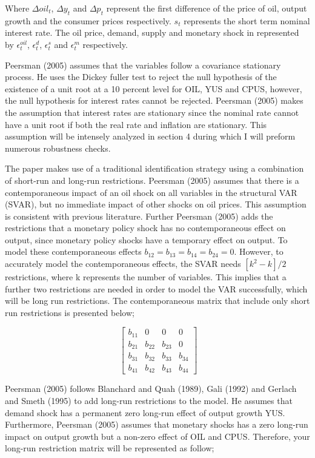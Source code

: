\documentclass[11pt,preprint, authoryear]{elsarticle}
\numberwithin{equation}{section}
\numberwithin{figure}{section}
\numberwithin{table}{section}
\begin{document}
Where \(\Delta oil_t\), \(\Delta y_t\) and \(\Delta p_t\) represent the
first difference of the price of oil, output growth and the consumer
prices respectively. \(s_t\) represents the short term nominal interest
rate. The oil price, demand, supply and monetary shock in represented by
\(\epsilon_t^{oil}\), \(\epsilon_t^{d}\), \(\epsilon_t^{s}\) and
\(\epsilon_t^{m}\) respectively.

Peersman (2005) assumes that the variables follow a covariance
stationary process. He uses the Dickey fuller test to reject the null
hypothesis of the existence of a unit root at a 10 percent level for
OIL, YUS and CPUS, however, the null hypothesis for interest rates
cannot be rejected. Peersman (2005) makes the assumption that interest
rates are stationary since the nominal rate cannot have a unit root if
both the real rate and inflation are stationary. This assumption will be
intensely analyzed in section 4 during which I will preform numerous
robustness checks.

The paper makes use of a traditional identification strategy using a
combination of short-run and long-run restrictions. Peersman (2005)
assumes that there is a contemporaneous impact of an oil shock on all
variables in the structural VAR (SVAR), but no immediate impact of other
shocks on oil prices. This assumption is consistent with previous
literature. Further Peersman (2005) adds the restrictions that a
monetary policy shock has no contemporaneous effect on output, since
monetary policy shocks have a temporary effect on output. To model these
contemporaneous effects \(b_{12} = b_{13} = b_{14} = b_{24} = 0\).
However, to accurately model the contemporaneous effects, the SVAR needs
\([k^2-k]/2\) restrictions, where k represents the number of variables.
This implies that a further two restrictions are needed in order to
model the VAR successfully, which will be long run restrictions. The
contemporaneous matrix that include only short run restrictions is
presented below;

\[\ \begin{bmatrix} b_{11}& 0 & 0 & 0 \\
b_{21}& b_{22}& b_{23} & 0 \\
b_{31}& b_{32}& b_{33} & b_{34} \\
b_{41}& b_{42}& b_{43} & b_{44} \end{bmatrix} \]

Peersman (2005) follows Blanchard and Quah (1989), Gali (1992) and
Gerlach and Smeth (1995) to add long-run restrictions to the model. He
assumes that demand shock has a permanent zero long-run effect of output
growth YUS. Furthermore, Peersman (2005) assumes that monetary shocks
has a zero long-run impact on output growth but a non-zero effect of OIL
and CPUS. Therefore, your long-run restriction matrix will be
represented as follow;
\end{document}
